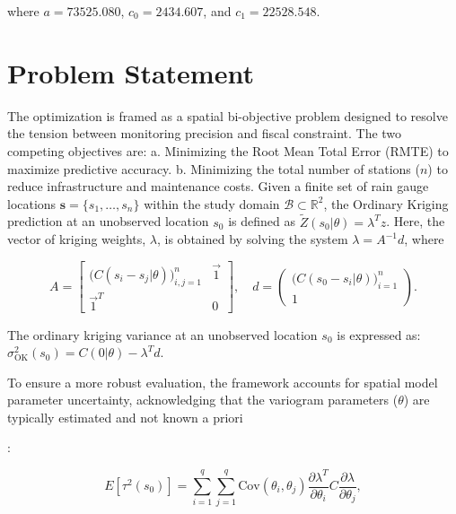 \documentclass[10pt,twoside]{article}
\numberwithin{equation}{section}
\begin{document}
where $a = 73525.080$, $c_0 = 2434.607$, and $c_1 = 22528.548$.

 

\section{Problem Statement}

 

The optimization is framed as a spatial bi-objective problem designed to resolve the tension between monitoring precision and fiscal constraint. The two competing objectives are: a. Minimizing the Root Mean Total Error (RMTE) to maximize predictive accuracy.  b. Minimizing the total number of stations ($n$) to reduce infrastructure and maintenance costs. Given a finite set of rain gauge locations $\mathbf{s} = \{s_1, \ldots, s_n\}$ within the study domain $\mathcal{B} \subset \mathbb{R}^2$, the Ordinary Kriging prediction at an unobserved location $s_0$ is defined as $\tilde{Z}(s_0|\theta) = \lambda^T z$. Here, the vector of kriging weights, $\lambda$, is obtained by solving the system $\lambda = A^{-1}d$, where

\begin{equation}\label{eq:kriging}

A = \begin{bmatrix} \bigl(C(s_i - s_j|\theta)\bigr)_{i,j=1}^n & \vec{1} \\ \vec{1}^T & 0 \end{bmatrix}, \quad

d = \begin{pmatrix} \bigl(C(s_0 - s_i|\theta)\bigr)_{i=1}^n \\ 1 \end{pmatrix}.

\end{equation}

The ordinary kriging variance at an unobserved location $s_0$ is expressed as: $\sigma^2_{\text{OK}}(s_0) = C(0|\theta) - \lambda^T d$.

To ensure a more robust evaluation, the framework accounts for spatial model parameter uncertainty, acknowledging that the variogram parameters ($\theta$) are typically estimated and not known a priori  %

\citep{Wadoux:2019}:

\begin{equation}\label{eq:paramunc}

E[\tau^2(s_0)] = \sum_{i=1}^{q}\sum_{j=1}^{q} \text{Cov}(\theta_i,\theta_j) \frac{\partial \lambda^T}{\partial \theta_i} C \frac{\partial \lambda}{\partial \theta_j},

\end{equation}
\end{document}
